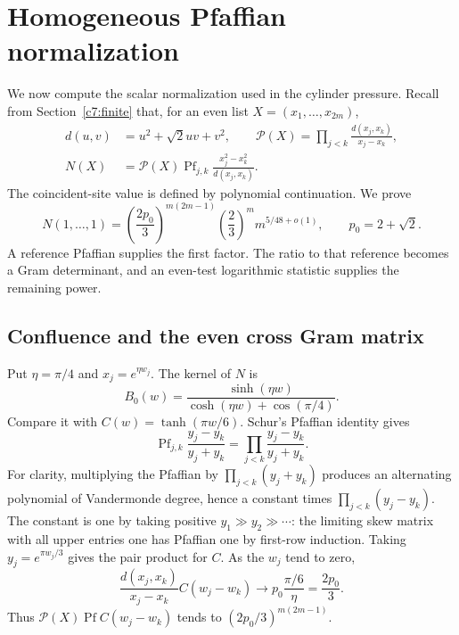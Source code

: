 \section{Homogeneous Pfaffian normalization}\label{c7:pfaffian}

We now compute the scalar normalization used in the cylinder pressure.
Recall from Section~\ref{c7:finite} that, for an even list
$X=(x_1,\ldots,x_{2m})$,
\[
 \begin{split}
 d(u,v)&=u^2+\sqrt2uv+v^2,\qquad
 \mathcal P(X)=\prod_{j<k}\frac{d(x_j,x_k)}{x_j-x_k},\\
 N(X)&=\mathcal P(X)\operatorname{Pf}_{j,k}
               \frac{x_j^2-x_k^2}{d(x_j,x_k)}.
 \end{split}
\]
The coincident-site value is defined by polynomial continuation. We prove
\begin{equation}\label{j:homogeneous-normalization}
 N(1,\ldots,1)
 =\left(\frac{2p_0}{3}\right)^{m(2m-1)}
  \left(\frac23\right)^m m^{5/48+o(1)},
 \qquad p_0=2+\sqrt2.
\end{equation}
A reference Pfaffian supplies the first factor. The ratio to that
reference becomes a Gram determinant, and an even-test logarithmic
statistic supplies the remaining power.

\subsection{Confluence and the even cross Gram matrix}

Put $\eta=\pi/4$ and $x_j=e^{\eta w_j}$. The kernel of $N$ is
\[
 B_0(w)=\frac{\sinh(\eta w)}{\cosh(\eta w)+\cos(\pi/4)}.
\]
Compare it with $C(w)=\tanh(\pi w/6)$. Schur's Pfaffian identity
\cite[(1.2)]{IshikawaOkadaTagawaZeng2006} gives
\[
 \operatorname{Pf}_{j,k}\frac{y_j-y_k}{y_j+y_k}
 =\prod_{j<k}\frac{y_j-y_k}{y_j+y_k}.
\]
For clarity, multiplying the Pfaffian by $\prod_{j<k}(y_j+y_k)$
produces an alternating polynomial of Vandermonde degree, hence a
constant times $\prod_{j<k}(y_j-y_k)$. The constant is one by taking
positive $y_1\gg y_2\gg\cdots$: the limiting skew matrix with all upper
entries one has Pfaffian one by first-row induction. Taking
$y_j=e^{\pi w_j/3}$ gives the pair product for $C$. As the $w_j$ tend
to zero,
\[
 \frac{d(x_j,x_k)}{x_j-x_k}C(w_j-w_k)
 \longrightarrow
 p_0\frac{\pi/6}{\eta}=\frac{2p_0}{3}.
\]
Thus $\mathcal P(X)\operatorname{Pf}C(w_j-w_k)$ tends to
$(2p_0/3)^{m(2m-1)}$.

